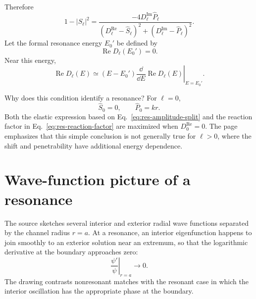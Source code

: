 Therefore
\begin{equation}
  \boxed{
  1-|S_\ell|^2
  =\frac{-4D_\ell^{\mathrm{Im}}\widehat P_\ell}
  {(D_\ell^{\mathrm{Re}}-\widehat S_\ell)^2
   +(D_\ell^{\mathrm{Im}}-\widehat P_\ell)^2}.}
  \label{eq:res-reaction-factor}
\end{equation}
Let the formal resonance energy $E_0'$ be defined by
\begin{equation}
  \operatorname{Re}D_\ell(E_0')=0.
  \label{eq:res-formal-energy}
\end{equation}
Near this energy,
\begin{equation}
  \operatorname{Re}D_\ell(E)
  \simeq
  (E-E_0')
  \left.
    \frac{\dd}{\dd E}\operatorname{Re}D_\ell(E)
  \right|_{E=E_0'}.
  \label{eq:res-D-linearization}
\end{equation}

Why does this condition identify a resonance?  For $\ell=0$,
\[
  \widehat S_0=0,
  \qquad
  \widehat P_0=kr.
\]
Both the elastic expression based on Eq.~\eqref{eq:res-amplitude-split} and the reaction factor in Eq.~\eqref{eq:res-reaction-factor} are maximized when $D_0^{\mathrm{Re}}=0$.  The page emphasizes that this simple conclusion is not generally true for $\ell>0$, where the shift and penetrability have additional energy dependence.

\section{Wave-function picture of a resonance}
The source sketches several interior and exterior radial wave functions separated by the channel radius $r=a$.  At a resonance, an interior eigenfunction happens to join smoothly to an exterior solution near an extremum, so that the logarithmic derivative at the boundary approaches zero:
\[
  \left.\frac{\psi'}{\psi}\right|_{r=a}\longrightarrow0.
\]
The drawing contrasts nonresonant matches with the resonant case in which the interior oscillation has the appropriate phase at the boundary.

\begin{center}
\end{center}

